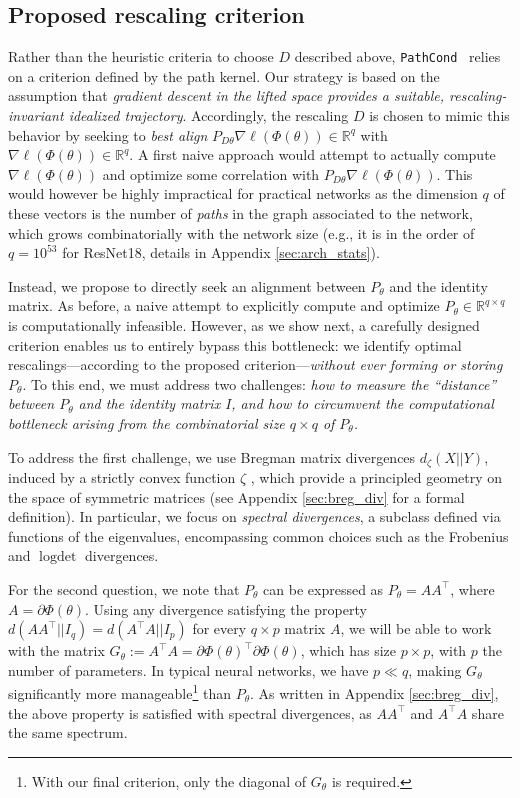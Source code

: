 \documentclass{article}
\theoremstyle{plain}
\theoremstyle{definition}
\theoremstyle{remark}
\def\logdet{\operatorname{logdet}}
\def\R{{\mathbb{R}}}
\def\pathcond{{\texttt{PathCond} }}
\begin{document}
{\subsection{Proposed rescaling criterion}

Rather than the heuristic criteria to choose $D$ described above,  \pathcond\ relies on a criterion defined by the path kernel.
Our strategy is based on the assumption that \emph{gradient descent in the lifted space provides a suitable, 
rescaling-invariant idealized trajectory}.
Accordingly, the rescaling $D$ is chosen to mimic this behavior
by seeking to \emph{best align} $P_{D\theta} \nabla \ell(\Phi(\theta)) \in \R^{q}$ with $\nabla \ell(\Phi(\theta)) \in \R^{q}$.
A first naive approach would attempt to actually compute $\nabla \ell(\Phi(\theta))$ and optimize some correlation with  $P_{D\theta} \nabla \ell(\Phi(\theta))$.
This would however be highly impractical for practical networks as the dimension $q$
of these vectors is the number of {\em paths} in the graph associated to the network,
which grows combinatorially with the network size
(e.g., it is in the order of $q=10^{53}$ for ResNet18, details in Appendix \ref{sec:arch_stats}).

Instead, we propose to directly seek an alignment between $P_{\theta}$ and the identity matrix. As before,
a naive attempt to explicitly compute and optimize $P_{\theta} \in \R^{q \times q}$ is computationally infeasible.
However, as we show next, a carefully designed criterion enables us to entirely
bypass this bottleneck: we identify optimal rescalings—according to the proposed criterion—\emph{without ever forming or storing} $P_{\theta}$.
To this end, we must address two challenges: \emph{how to measure the ``distance'' between $P_{\theta}$ and the identity matrix $I$, and how to circumvent the computational bottleneck arising from the combinatorial size $q \times q$ of $P_{\theta}$.}


To address the first challenge, we use Bregman matrix divergences $d_\zeta(X||Y)$, induced by a strictly 
convex function $\zeta$ \citep{kulis2009low}, 
which provide a principled geometry on the space of symmetric matrices (see Appendix \ref{sec:breg_div} for a formal definition). 
In particular, we focus on \emph{spectral divergences}, 
a subclass defined via functions of the eigenvalues, 
encompassing common choices such as the Frobenius and $\logdet$ \citep{james1961estimation} divergences.

For the second question, we note that $P_{\theta}$ can be expressed as $P_{\theta} = AA^\top$, where $A = \partial \Phi(\theta)$. 
Using any divergence satisfying the property $d(AA^\top || I_q) = d(A^\top A || I_p)$ for every $q \times p$ matrix $A$,
we will be able to work with the matrix $G_\theta := A^\top A = \partial \Phi(\theta)^\top \partial \Phi(\theta)$, 
which has size $p \times p$, with $p$ the number of parameters. 
In typical neural networks, we have $p \ll q$, making $G_{\theta}$ 
significantly more manageable\footnote{With our final criterion, only the diagonal of $G_{\theta}$ is required.} than $P_{\theta}$.
As written in Appendix \ref{sec:breg_div}, 
the above property is satisfied with spectral divergences, as $AA^{\top}$ and $A^{\top}A$ share the 
same spectrum.


}
\end{document}
